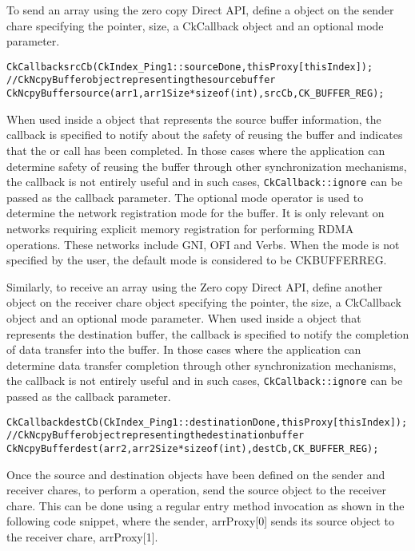 \vspace{0.1in}
\noindent
To send an array using the zero copy Direct API, define a 
object on the sender chare specifying the pointer, size, a CkCallback
object and an optional mode parameter.

\begin{alltt}
CkCallback srcCb(CkIndex_Ping1::sourceDone, thisProxy[thisIndex]);
// CkNcpyBuffer object representing the source buffer
CkNcpyBuffer source(arr1, arr1Size * sizeof(int), srcCb, CK_BUFFER_REG);
\end{alltt}

When used inside a  object that represents the source buffer
information, the callback is specified to notify about the safety of
reusing the buffer and indicates that the  or 
call has been completed. In those cases where the application can determine
safety of reusing the buffer through other synchronization mechanisms, the
callback is not entirely useful and in such cases, \texttt{CkCallback::ignore}
can be passed as the callback parameter. The optional mode operator is used to
determine the network registration mode for the buffer. It is only relevant
on networks requiring explicit memory registration for performing RDMA operations.
These networks include GNI, OFI and Verbs. When the mode is not specified by
the user, the default mode is considered to be
CK\textunderscore BUFFER\textunderscore REG.

Similarly, to receive an array using the Zero copy Direct API, define another
 object on the receiver chare object specifying the
pointer, the size, a CkCallback object and an optional mode parameter.
When used inside a  object that represents the destination
buffer, the callback is specified to notify the completion of data transfer
into the  buffer.
In those cases where the application can determine data transfer completion
through other synchronization mechanisms, the callback is not entirely useful
and in such cases, \texttt{CkCallback::ignore} can be passed as the callback
parameter.

\begin{alltt}
CkCallback destCb(CkIndex_Ping1::destinationDone, thisProxy[thisIndex]);
// CkNcpyBuffer object representing the destination buffer
CkNcpyBuffer dest(arr2, arr2Size * sizeof(int), destCb, CK_BUFFER_REG);
\end{alltt}

Once the source  and destination  objects have
been defined on the sender and receiver chares, to perform a  operation, send
the source  object to the receiver chare. This can be done using a
regular entry method invocation as shown in the following code snippet,
where the sender, arrProxy[0] sends its source object to the receiver chare, arrProxy[1].

